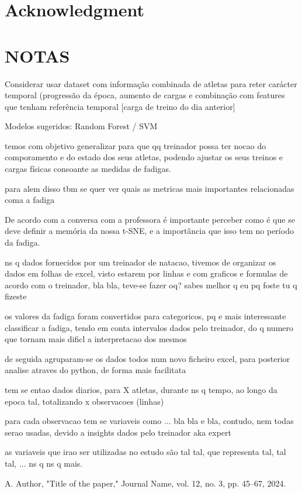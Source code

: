 \documentclass[conference]{IEEEtran}
\begin{document}
\section*{Acknowledgment}




\section{NOTAS}

Considerar usar dataset com informação combinada de atletas para reter carácter temporal (progressão da época, aumento de cargas e combinação com features que tenham referência temporal [carga de treino do dia anterior]

Modelos sugeridos: Random Forest / SVM

temos com objetivo generalizar para que qq treinador possa ter nocao do comporamento e do estado dos seus atletas, podendo ajustar os seus treinos e cargas físicas consoante as medidas de fadigas.

para alem disso tbm se quer ver quais as metricas mais importantes relacionadas coma a fadiga

De acordo com a conversa com a professora é importante perceber como é que se deve definir a memória da nossa t-SNE, e a importância que isso tem no período da fadiga.

ns q dados fornecidos por um treinador de natacao, tivemos de organizar os dados em folhas de excel, visto estarem por linhas e com graficos e formulas de acordo com o treinador, bla bla, teve-se fazer oq? sabes melhor q eu pq foste tu q fizeste

os valores da fadiga foram convertidos para categoricos, pq e mais interessante classificar a fadiga, tendo em conta intervalos dados pelo treinador, do q numero que tornam mais dificl a interpretacao dos mesmos

de seguida agruparam-se os dados todos num novo ficheiro excel, para posterior analise atraves do python, de forma mais facilitata

tem se entao dados diarios, para X atletas, durante ns q tempo, ao longo da epoca tal, totalizando x observacoes (linhas)

para cada observacao tem se variaveis como ... bla bla e bla, contudo, nem todas serao usadas, devido a insights dados pelo treinador aka expert

as variaveis que irao ser utilizadas no estudo são tal tal, que representa tal, tal tal, ... ns q ns q mais.








\begin{thebibliography}{99}
 A. Author, "Title of the paper," Journal Name, vol. 12, no. 3, pp. 45--67, 2024.
\end{thebibliography}
\end{document}
